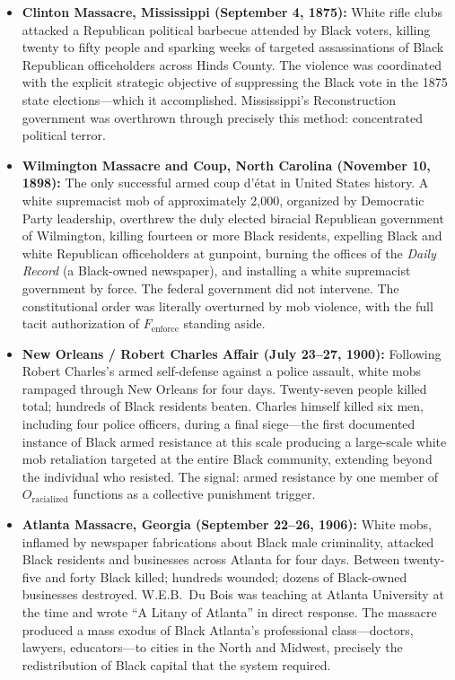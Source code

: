 \begin{itemize}
    \item \textbf{Clinton Massacre, Mississippi (September 4, 1875):} White rifle clubs attacked a Republican political barbecue attended by Black voters, killing twenty to fifty people and sparking weeks of targeted assassinations of Black Republican officeholders across Hinds County. The violence was coordinated with the explicit strategic objective of suppressing the Black vote in the 1875 state elections---which it accomplished. Mississippi's Reconstruction government was overthrown through precisely this method: concentrated political terror.

    \item \textbf{Wilmington Massacre and Coup, North Carolina (November 10, 1898):} The only successful armed coup d'état in United States history. A white supremacist mob of approximately 2,000, organized by Democratic Party leadership, overthrew the duly elected biracial Republican government of Wilmington, killing fourteen or more Black residents, expelling Black and white Republican officeholders at gunpoint, burning the offices of the \textit{Daily Record} (a Black-owned newspaper), and installing a white supremacist government by force. The federal government did not intervene. The constitutional order was literally overturned by mob violence, with the full tacit authorization of $F_{\text{enforce}}$ standing aside.

    \item \textbf{New Orleans / Robert Charles Affair (July 23--27, 1900):} Following Robert Charles's armed self-defense against a police assault, white mobs rampaged through New Orleans for four days. Twenty-seven people killed total; hundreds of Black residents beaten. Charles himself killed six men, including four police officers, during a final siege---the first documented instance of Black armed resistance at this scale producing a large-scale white mob retaliation targeted at the entire Black community, extending beyond the individual who resisted. The signal: armed resistance by one member of $O_{\text{racialized}}$ functions as a collective punishment trigger.

    \item \textbf{Atlanta Massacre, Georgia (September 22--26, 1906):} White mobs, inflamed by newspaper fabrications about Black male criminality, attacked Black residents and businesses across Atlanta for four days. Between twenty-five and forty Black killed; hundreds wounded; dozens of Black-owned businesses destroyed. W.E.B.\ Du Bois was teaching at Atlanta University at the time and wrote ``A Litany of Atlanta'' in direct response. The massacre produced a mass exodus of Black Atlanta's professional class---doctors, lawyers, educators---to cities in the North and Midwest, precisely the redistribution of Black capital that the system required.


\end{itemize}
